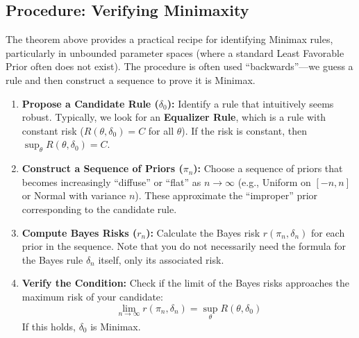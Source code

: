\documentclass[
  letterpaper,
  DIV=11,
  numbers=noendperiod]{scrreprt}
\renewcommand{\[}{\begin{equation}}
\renewcommand{\]}{\end{equation}}
\theoremstyle{definition}
\theoremstyle{plain}
\theoremstyle{plain}
\theoremstyle{plain}
\theoremstyle{definition}
\theoremstyle{plain}
\theoremstyle{remark}
\begin{document}
\subsection{Procedure: Verifying
Minimaxity}\label{procedure-verifying-minimaxity}

The theorem above provides a practical recipe for identifying Minimax
rules, particularly in unbounded parameter spaces (where a standard
Least Favorable Prior often does not exist). The procedure is often used
``backwards''---we guess a rule and then construct a sequence to prove
it is Minimax.

\begin{enumerate}
\def\labelenumi{\arabic{enumi}.}
\item
  \textbf{Propose a Candidate Rule (\(\delta_0\)):} Identify a rule that
  intuitively seems robust. Typically, we look for an \textbf{Equalizer
  Rule}, which is a rule with constant risk (\(R(\theta, \delta_0) = C\)
  for all \(\theta\)). If the risk is constant, then
  \(\sup_\theta R(\theta, \delta_0) = C\).
\item
  \textbf{Construct a Sequence of Priors (\(\pi_n\)):} Choose a sequence
  of priors that becomes increasingly ``diffuse'' or ``flat'' as
  \(n \to \infty\) (e.g., Uniform on \([-n, n]\) or Normal with variance
  \(n\)). These approximate the ``improper'' prior corresponding to the
  candidate rule.
\item
  \textbf{Compute Bayes Risks (\(r_n\)):} Calculate the Bayes risk
  \(r(\pi_n, \delta_n)\) for each prior in the sequence. Note that you
  do not necessarily need the formula for the Bayes rule \(\delta_n\)
  itself, only its associated risk.
\item
  \textbf{Verify the Condition:} Check if the limit of the Bayes risks
  approaches the maximum risk of your candidate:
  \[ \lim_{n \to \infty} r(\pi_n, \delta_n) = \sup_{\theta} R(\theta, \delta_0) \]
  If this holds, \(\delta_0\) is Minimax.
\end{enumerate}
\end{document}
